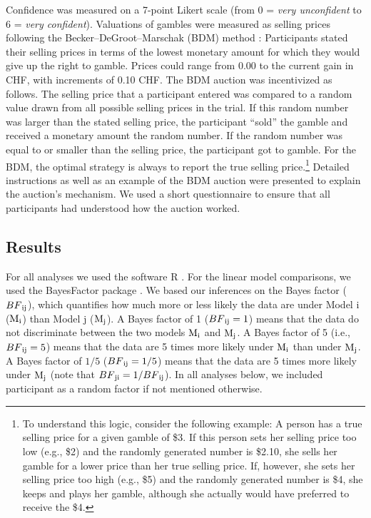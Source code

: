 \documentclass[a4paper, man, natbib, floatsintext]{apa6} %
\begin{document}
Confidence was measured on a 7-point Likert scale (from 0 = \textit{very unconfident} to 6 = \textit{very confident}). Valuations of gambles were measured as selling prices following the Becker--DeGroot--Marschak (BDM) method \citep{Becker1964}: Participants stated their selling prices in terms of the lowest monetary amount for which they would give up the right to gamble. Prices could range from 0.00 to the current gain in CHF, with increments of 0.10 CHF. The BDM auction was incentivized as follows. The selling price that a participant entered was compared to a random value drawn from all possible selling prices in the trial. If this random number was larger than the stated selling price, the participant ``sold'' the gamble and received a monetary amount  the random number. If the random number was equal to or smaller than the selling price, the participant got to gamble. For the BDM, the optimal strategy is always to report the true selling price.\footnote{\label{logic.BDM} 
To understand this logic, consider the following example: A person has a true selling price for a given gamble of \$3. If this person sets her selling price too low (e.g., \$2) and the randomly generated number is \$2.10, she sells her gamble for a lower price than her true selling price. If, however, she sets her selling price too high (e.g., \$5) and the randomly generated number is \$4, she keeps and plays her gamble, although she actually would have preferred to receive the \$4.
} Detailed instructions as well as an example of the BDM auction were presented to explain the auction's mechanism. We used a short questionnaire to ensure that all participants had understood how the auction worked.

\subsection{Results}

For all analyses we used the software R \citep{R2014}. For the linear model comparisons, we used the BayesFactor package \citep{BayesFactor}. We based our inferences on the Bayes factor ($BF\textsubscript{ij}$), which quantifies how much more or less likely the data are under Model i ($\mathrm{M}\textsubscript{i}$) than Model j ($\mathrm{M}\textsubscript{j}$). A Bayes factor of 1 ($BF\textsubscript{ij} = 1$) means that the data do not discriminate between the two models $\mathrm{M}\textsubscript{i}$ and $\mathrm{M}\textsubscript{j}$. A Bayes factor of 5 (i.e., $BF\textsubscript{ij} = 5$) means that the data are 5 times more likely under $\mathrm{M}\textsubscript{i}$ than under $\mathrm{M}\textsubscript{j}$. A Bayes factor of $1/5$ ($BF\textsubscript{ij} = 1/5$) means that the data are 5 times more likely under $\mathrm{M}\textsubscript{j}$ (note that $BF\textsubscript{ji} = 1/BF\textsubscript{ij}$). 
In all analyses below, we included participant as a random factor if not mentioned otherwise.
\end{document}
